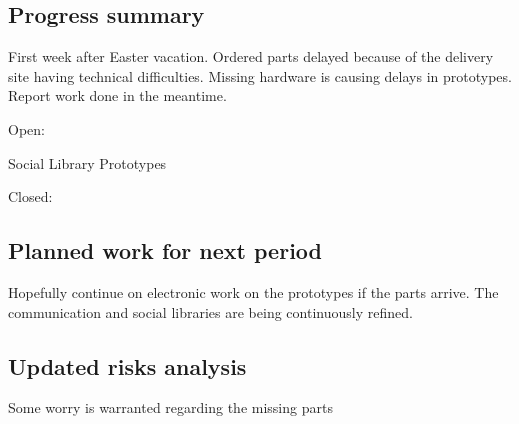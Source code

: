 \subsection{Progress summary}

First week after Easter vacation. Ordered parts delayed because of the delivery site having technical difficulties. Missing hardware is causing delays in prototypes. Report work done in the meantime.

Open:

Social Library
Prototypes

Closed:

\subsection{Planned work for next period}

Hopefully continue on electronic work on the prototypes if the parts arrive. The communication and social libraries are being continuously refined.

\subsection{Updated risks analysis}

Some worry is warranted regarding the missing parts
